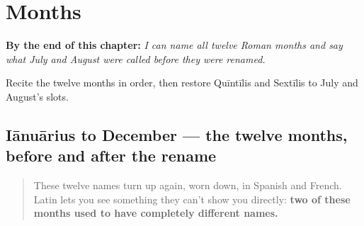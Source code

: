 
\chapter{Months}
\label{ch:la-months}

\begin{chapteropening}
\textbf{By the end of this chapter:} \emph{I can name all twelve Roman months and say what July and August were called before they were renamed.}

Recite the twelve months in order, then restore Quīntīlis and Sextīlis to July and August's slots.
\end{chapteropening}

\section[Iānuārius, Februārius, Mārtius …]{Iānuārius to December — the twelve months, before and after the rename}

\label{lesson:LA-C11-menses}



\begin{quote}
These twelve names turn up again, worn down, in Spanish and French. Latin lets you see something they can't show you directly: \textbf{two of these months used to have completely different names.}
\end{quote}

